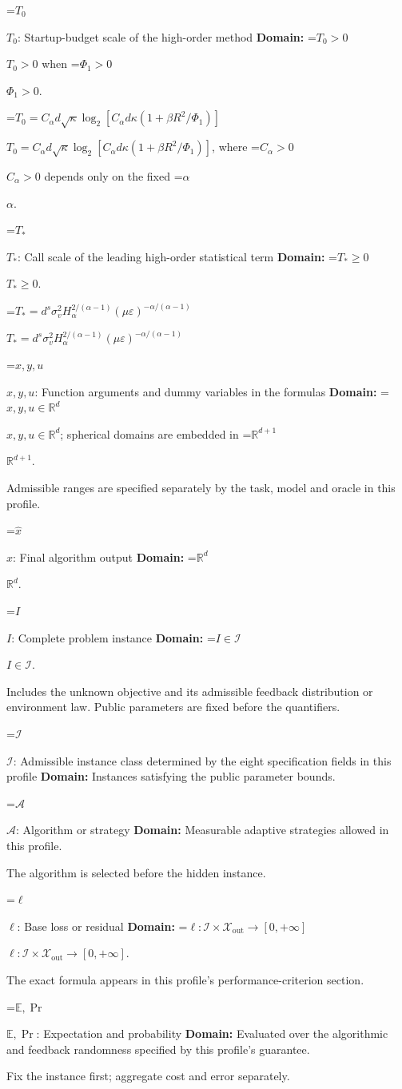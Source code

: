 \documentclass[10pt,a4paper]{article}
\newcommand{\AtlasMath}[1]{\par\begingroup\centering\setbox0=\hbox{$\displaystyle #1$}\ifdim\wd0>1.4\linewidth\typeout{ATLAS WIDE FORMULA: \the\wd0}\fi\ifdim\wd0>\linewidth\resizebox{\linewidth}{!}{\box0}\else\box0\fi\par\endgroup}
\newcommand{\AtlasInlineMath}[1]{\begingroup\setbox0=\hbox{$#1$}\ifdim\wd0>.4\linewidth\endgroup\AtlasMath{#1}\else\endgroup$#1$\fi}
\begin{document}
\AtlasInlineMath{T_0}: Startup-budget scale of the high-order method \textbf{Domain:} \AtlasInlineMath{T_0>0} when \AtlasInlineMath{\Phi_1>0}.

\AtlasInlineMath{T_0=C_\alpha d\sqrt\kappa\log_2[C_\alpha d\kappa(1+\beta R^2/\Phi_1)]}, where \AtlasInlineMath{C_\alpha>0} depends only on the fixed \AtlasInlineMath{\alpha}.

\AtlasInlineMath{T_*}: Call scale of the leading high-order statistical term \textbf{Domain:} \AtlasInlineMath{T_*\ge0}.

\AtlasInlineMath{T_*=d^s\sigma_v^2H_\alpha^{2/(\alpha-1)}(\mu\varepsilon)^{-\alpha/(\alpha-1)}}

\AtlasInlineMath{x,y,u}: Function arguments and dummy variables in the formulas \textbf{Domain:} \AtlasInlineMath{x,y,u\in\mathbb{R}^d}; spherical domains are embedded in \AtlasInlineMath{\mathbb{R}^{d+1}}.

Admissible ranges are specified separately by the task, model and oracle in this profile.

\AtlasInlineMath{\widehat{x}}: Final algorithm output \textbf{Domain:} \AtlasInlineMath{\mathbb{R}^d}.

\AtlasInlineMath{I}: Complete problem instance \textbf{Domain:} \AtlasInlineMath{I\in\mathcal{I}}.

Includes the unknown objective and its admissible feedback distribution or environment law. Public parameters are fixed before the quantifiers.

\AtlasInlineMath{\mathcal{I}}: Admissible instance class determined by the eight specification fields in this profile \textbf{Domain:} Instances satisfying the public parameter bounds.

\AtlasInlineMath{\mathcal{A}}: Algorithm or strategy \textbf{Domain:} Measurable adaptive strategies allowed in this profile.

The algorithm is selected before the hidden instance.

\AtlasInlineMath{\ell}: Base loss or residual \textbf{Domain:} \AtlasInlineMath{\ell:\mathcal{I}\times\mathcal{X}_{\mathrm{out}}\to[0,+\infty]}.

The exact formula appears in this profile's performance-criterion section.

\AtlasInlineMath{\mathbb{E},\Pr}: Expectation and probability \textbf{Domain:} Evaluated over the algorithmic and feedback randomness specified by this profile's guarantee.

Fix the instance first; aggregate cost and error separately.
\end{document}
